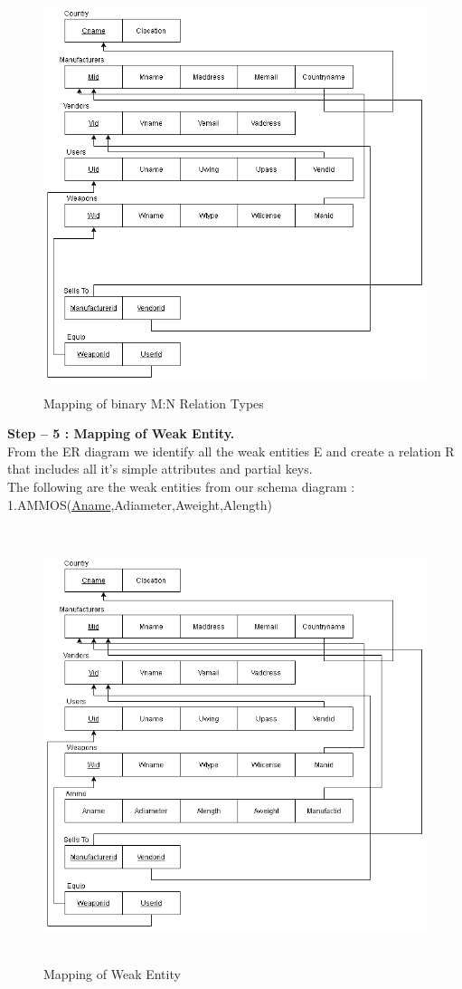 \documentclass[12pt,a4paper]{report}
\begin{document}
\begin{figure}[hbtp]
\includegraphics[width=6in,height=4.5in]{../fig/M-N}
\caption{Mapping of binary M:N Relation Types}
\end{figure}
\newpage
\textbf{Step – 5 : Mapping of Weak Entity.}\\
From the ER diagram we identify all the weak entities E and create a relation R that includes all it’s simple attributes and partial keys.\\
The following are the weak entities from our schema diagram :\\
1.AMMOS(\underline{Aname},Adiameter,Aweight,Alength)
\begin{figure}[hbtp]
\includegraphics[width=6in,height=5.0in]{../fig/RS}
\caption{Mapping of Weak Entity}
\end{figure}
\end{document}
